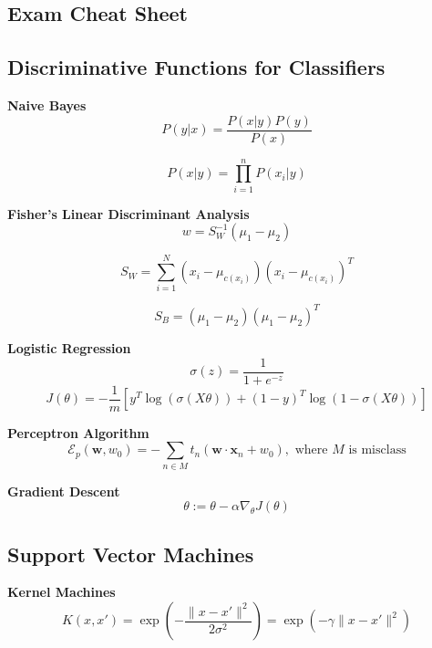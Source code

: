 \documentclass[8pt]{article}
\begin{document}
\begin{multicols}{2}
\section*{Exam Cheat Sheet}

\subsection*{Discriminative Functions for Classifiers}
\textbf{Naive Bayes}
\begin{equation}
    P(y|x) = \frac{P(x|y)P(y)}{P(x)}
\end{equation}

\begin{equation}
    P(x|y) = \prod_{i=1}^{n} P(x_i|y)
\end{equation}

\textbf{Fisher's Linear Discriminant Analysis}
\begin{equation}
    w = S_W^{-1} (\mu_1 - \mu_2)
\end{equation}

\begin{equation}
    S_W = \sum_{i=1}^{N} (x_i - \mu_{c(x_i)})(x_i - \mu_{c(x_i)})^T
\end{equation}

\begin{equation}
    S_B = (\mu_1 - \mu_2)(\mu_1 - \mu_2)^T
\end{equation}

\textbf{Logistic Regression}
\begin{equation}
    \sigma(z) = \frac{1}{1 + e^{-z}}
\end{equation}
\begin{equation}
    J(\theta) = -\frac{1}{m} [y^T\log(\sigma(X\theta)) + (1-y)^T\log(1-\sigma(X\theta))]
\end{equation}

\textbf{Perceptron Algorithm}
\begin{equation}
    \mathcal{E}_p (\mathbf{w}, w_0) = -\sum_{n \in M} t_n(\mathbf{w} \cdot \mathbf{x}_n + w_0), \text{ where } M \text{ is misclass} 
\end{equation}

\textbf{Gradient Descent}
\begin{equation}
    \theta := \theta - \alpha \nabla_{\theta} J(\theta)
\end{equation}

\subsection*{Support Vector Machines}
\textbf{Kernel Machines}
\begin{equation}
    K(x, x') = \exp(-\frac{\|x - x'\|^2}{2\sigma^2}) = \exp(-\gamma \|x - x'\|^2)
\end{equation}


\end{multicols}
\end{document}
